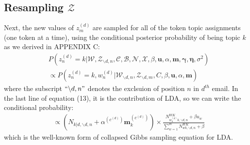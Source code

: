 \documentclass[a4paper]{article}
\begin{document}
 \subsection{Resampling $\mathcal{Z}$}  \label{subsec: Resampling Z}
 Next, the new values of $z^{(d)}_m$ are sampled for all of the token topic assignments (one token at a time), using the conditional posterior probability of being topic $k$ as we derived in APPENDIX C:
 \begin{equation}
 \begin{aligned} & 
 P(z^{(d)}_n=k|\mathcal{W}, \mathcal{Z}_{\backslash d, n},  \mathcal{C}, \mathcal{B}, \mathcal{N}, \mathcal{X}, \beta, \boldsymbol{u}, \alpha, \boldsymbol{m}, \boldsymbol{\gamma}, \boldsymbol{\eta}, \sigma^2)\\
 & \propto P(z^{(d)}_n=k, w^{(d)}_n|\mathcal{W}_{\backslash d, n}, \mathcal{Z}_{\backslash d,m}, C, \beta, \boldsymbol{u}, \alpha, \boldsymbol{m})
 \end{aligned}
 \end{equation}
 where the subscript $``{\backslash d, n}"$ denotes the exclsuion of position $n$ in $d^{th}$ email. In the last line of equation (13), it is the contribution of LDA, so we can write the conditional probability:
 \begin{equation}
 \begin{aligned} 
 & \propto(N_{k|d, \backslash d, n}+\alpha^{(c^{(d)})} \boldsymbol{m}^{(c^{(d)})}_k)\times\frac{N_{w_n^{(d)}k, \backslash d, n}^{WK}+\beta u_w}{\sum_{w=1}^WN_{wk,  \backslash d, n}^{WK}+\beta}
 \end{aligned}
 \end{equation}
 which is the well-known form of collapsed Gibbs sampling equation for LDA.
\end{document}
